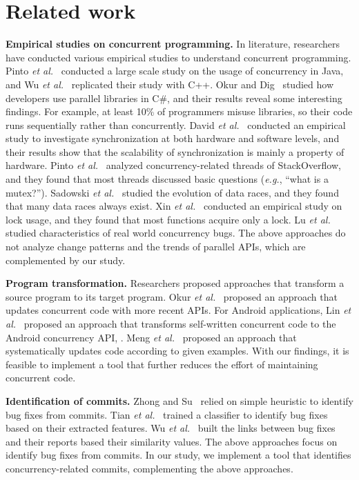 \section{Related work}
\label{sec:related}
\noindent
\textbf{Empirical studies on concurrent programming.} In literature, researchers have conducted various empirical studies to understand concurrent programming. Pinto \emph{et al.}~\cite{journals/jss/PintoTFFB15} conducted a large scale study on the usage of concurrency in Java, and Wu \emph{et al.}~\cite{journals/infsof/WuCZX16} replicated their study with C++. Okur and Dig~\cite{conf/sigsoft/OkurD12} studied how developers use parallel libraries in C\#, and their results reveal some interesting findings. For example, at least 10\% of programmers misuse libraries, so their code runs sequentially rather than concurrently. David \emph{et al.}~\cite{conf/sosp/DavidGT13} conducted an empirical study to investigate synchronization at both hardware and software levels, and their results show that the scalability of synchronization is mainly a property of hardware. Pinto \emph{et al.}~\cite{conf/oopsla/PintoTC15} analyzed concurrency-related threads of StackOverflow, and they found that most threads discussed basic questions (\emph{e.g.}, ``what is a mutex?''). Sadowski \emph{et al.}~\cite{conf/msr/SadowskiYK12} studied the evolution of data races, and they found that many data races always exist. Xin \emph{et al.}~\cite{conf/icsm/XinQHXZWG13} conducted an empirical study on lock usage, and they found that most functions acquire only a lock. Lu \emph{et al.}~\cite{conf/asplos/LuPSZ08} studied characteristics of real world concurrency bugs. The above approaches do not analyze change patterns and the trends of parallel APIs, which are complemented by our study.

\noindent
\textbf{Program transformation.} Researchers proposed approaches that transform a source program to its target program. Okur \emph{et al.}~\cite{conf/ecoop/OkurED14} proposed an approach that updates concurrent code with more recent APIs. For Android applications, Lin \emph{et al.}~\cite{conf/sigsoft/LinRD14} proposed an approach that transforms self-written concurrent code to the Android concurrency API, . Meng \emph{et al.}~\cite{conf/pldi/MengKM11} proposed an approach that systematically updates code according to given examples. With our findings, it is feasible to implement a tool that further reduces the effort of maintaining concurrent code.

\noindent
\textbf{Identification of commits.} Zhong and Su~\cite{zhong2015bugfix} relied on simple heuristic to identify bug fixes from commits. Tian \emph{et al.}~\cite{tian2012identifying} trained a classifier to identify bug fixes based on their extracted features. Wu \emph{et al.}~\cite{wu2011relink} built the links between bug fixes and their reports based their similarity values. The above approaches focus on identify bug fixes from commits. In our study, we implement a tool that identifies concurrency-related commits, complementing the above approaches.
